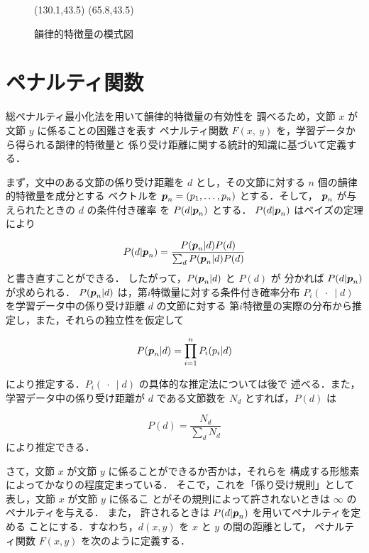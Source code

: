 \begin{figure}
\begin{center}
\atari(130.1,43.5)
\atari(65.8,43.5)
\caption{韻律的特徴量の模式図}
\label{prosody3}
\end{center}
\end{figure}

\section{ペナルティ関数}
\vspace{-1mm}
総ペナルティ最小化法を用いて韻律的特徴量の有効性を
調べるため，文節 $x$ が文節 $y$ に係ることの困難さを表す
ペナルティ関数 $F(x,\ y)$ を，学習データから得られる韻律的特徴量と
係り受け距離に関する統計的知識に基づいて定義する．

まず，文中のある文節の係り受け距離を $d$ とし，その文節に対する
 $n$ 個の韻律的特徴量を成分とする
ベクトルを $\mbox{\boldmath$p$}_n=(p_1,\ldots,p_n)$ とする．そして，
$\mbox{\boldmath$p$}_n$ が与えられたときの $d$ の条件付き確率
を $P(d|\mbox{\boldmath$p$}_n)$ とする．
$P(d|\mbox{\boldmath$p$}_n)$ はベイズの定理により

\begin{equation}
P(d|\mbox{\boldmath$p$}_n) =
\frac{P(\mbox{\boldmath$p$}_n|d)P(d)}
{ \sum_{d} P(\mbox{\boldmath$p$}_n|d)P(d)}
\end{equation}
と書き直すことができる．
したがって，$P(\mbox{\boldmath$p$}_n|d)$ と $P(d)$ が
分かれば $P(d|\mbox{\boldmath$p$}_n)$ が求められる．
$P(\mbox{\boldmath$p$}_n|d)$ は，第$i$特徴量に対する条件付き確率分布 
$P_{i}(\ \cdot\ \mid d)$ を学習データ中の係り受け距離 $d$ の文節に対する
第$i$特徴量の実際の分布から推定し，また，それらの独立性を仮定して

\begin{equation}
P(\mbox{\boldmath$p$}_n|d) = \prod_{i=1}^{n}P_{i}(p_{i}|d)
\end{equation}

\noindent
により推定する．$P_{i}(\ \cdot\ \mid d)$ の具体的な推定法については後で
述べる．また，学習データ中の係り受け距離が $d$ である文節数を
$N_d$ とすれば，$P(d)$ は

\begin{equation}
P(d) = \frac{N_d}{\displaystyle\sum_{d} N_d}
\end{equation}
により推定できる．

さて，文節 $x$ が文節 $y$ に係ることができるか否かは，それらを
構成する形態素によってかなりの程度定まっている．
そこで，これを「係り受け規則」として表し，文節 $x$ が文節 $y$ に係るこ
とがその規則によって許されないときは $\infty$ のペナルティを与える．
また，
許されるときは $P(d|\mbox{\boldmath$p$}_n)$ を用いてペナルティを定める
ことにする．すなわち，$d(x, y)$ を $x$ と $y$ の間の距離として，
ペナルティ関数 $F(x,y)$ を次のように定義する\cite{EGU}．

